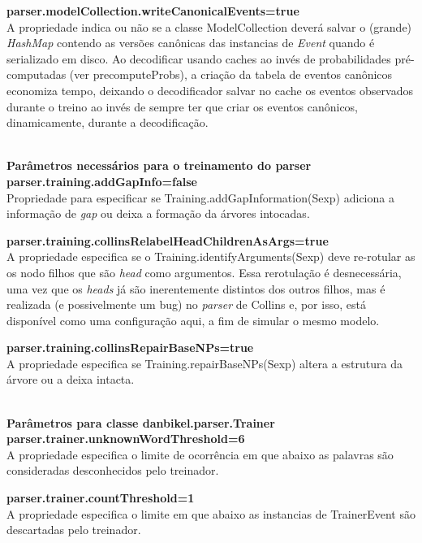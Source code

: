 \textbf{parser.modelCollection.writeCanonicalEvents=true}\\
A propriedade indica ou não se a classe ModelCollection deverá salvar o (grande) \emph{HashMap} contendo as versões canônicas das instancias de \emph{Event} quando é serializado em disco. Ao decodificar usando caches ao invés de probabilidades pré-computadas (ver precomputeProbs), a criação da tabela de eventos canônicos economiza tempo, deixando o decodificador salvar no cache os eventos observados durante o treino ao invés de sempre ter que criar os eventos canônicos, dinamicamente, durante a decodificação.

\HRule \\

\textbf{Parâmetros necessários para o treinamento do parser}\\

\textbf{parser.training.addGapInfo=false}\\
Propriedade para especificar se Training.addGapInformation(Sexp) adiciona a informação de \emph{gap} ou deixa a formação da árvores intocadas.

\textbf{parser.training.collinsRelabelHeadChildrenAsArgs=true}\\
A propriedade especifica se o Training.identifyArguments(Sexp) deve re-rotular as os nodo filhos que são \emph{head} como argumentos. Essa rerotulação é desnecessária, uma vez que os \emph{heads} já são inerentemente distintos dos outros filhos, mas é realizada (e possivelmente um bug) no \emph{parser} de Collins e, por isso, está disponível como uma configuração aqui, a fim de simular o mesmo modelo.

\textbf{parser.training.collinsRepairBaseNPs=true}\\
A propriedade especifica se Training.repairBaseNPs(Sexp) altera a estrutura da árvore ou a deixa intacta.

\HRule \\

\textbf{Parâmetros para classe danbikel.parser.Trainer}\\

\textbf{parser.trainer.unknownWordThreshold=6}\\
A propriedade especifica o limite de ocorrência em que abaixo as palavras são consideradas desconhecidos pelo treinador.

\textbf{parser.trainer.countThreshold=1}\\
A propriedade especifica o limite em que abaixo as instancias de TrainerEvent são descartadas pelo treinador.

